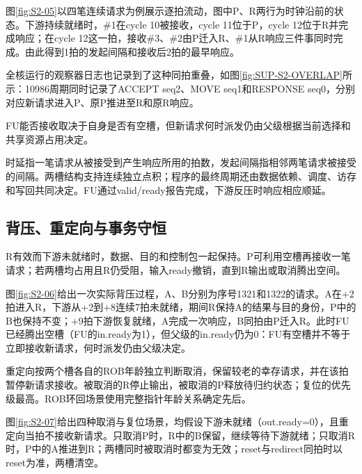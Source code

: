图\ref{fig:S2-05}以四笔连续请求为例展示逐拍流动，图中P、R两行为时钟沿前的状态。下游持续就绪时，\#1在cycle 10被接收，cycle 11位于P，cycle 12位于R并完成响应；在cycle 12这一拍，接收\#3、\#2由P迁入R、\#1从R响应三件事同时完成。由此得到1拍的发起间隔和接收后2拍的最早响应。


全核运行的观察器日志也记录到了这种同拍重叠，如图\ref{fig:SUP-S2-OVERLAP}所示：10986周期同时记录了ACCEPT seq2、MOVE seq1和RESPONSE seq0，分别对应新请求进入P、原P推进至R和原R响应。


FU能否接收取决于自身是否有空槽，但新请求何时派发仍由父级根据当前选择和共享资源占用决定。

时延指一笔请求从被接受到产生响应所用的拍数，发起间隔指相邻两笔请求被接受的间隔。两槽结构支持连续独立点积；程序的最终周期还由数据依赖、调度、访存和写回共同决定。FU通过valid/ready报告完成，下游反压时响应相应顺延。

\subsection{背压、重定向与事务守恒}
R有效而下游未就绪时，数据、目的和控制包一起保持。P可利用空槽再接收一笔请求；若两槽均占用且R仍受阻，输入ready撤销，直到R输出或取消腾出空间。

图\ref{fig:S2-06}给出一次实际背压过程，A、B分别为序号1321和1322的请求。A在+2拍进入R，下游从+2到+8连续7拍未就绪，期间R保持A的结果与目的身份，P中的B也保持不变；+9拍下游恢复就绪，A完成一次响应，B同拍由P迁入R。此时FU已经腾出空槽（FU的in.ready为1），但父级的in.ready仍为0：FU有空槽并不等于立即接收新请求，何时派发仍由父级决定。


重定向按两个槽各自的ROB年龄独立判断取消，保留较老的幸存请求，并在该拍暂停新请求接收。被取消的R停止输出，被取消的P释放待归约状态；复位的优先级最高。ROB环回场景使用完整指针年龄关系确定先后。

图\ref{fig:S2-07}给出四种取消与复位场景，均假设下游未就绪（out.ready=0），且重定向当拍不接收新请求。只取消P时，R中的B保留，继续等待下游就绪；只取消R时，P中的A推进到R；两槽同时被取消时都变为无效；reset与redirect同拍时以reset为准，两槽清空。

